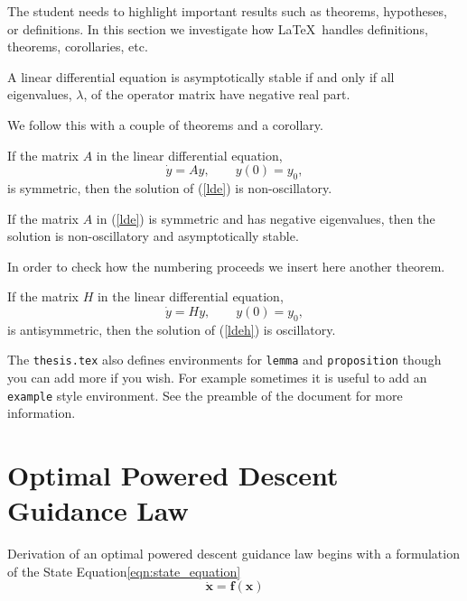 The student needs to highlight important results such as theorems,
hypotheses, or definitions. In this section we investigate how
\LaTeX\ handles definitions, theorems, corollaries, etc.
\begin{definition}   
  A linear differential equation is asymptotically stable if and only
  if all eigenvalues, $\lambda$, of the operator matrix have negative
  real part.
\end{definition}
We follow this with a couple of theorems and a corollary.
\begin{theorem}
  If the matrix $A$ in the linear differential equation,
  \begin{equation}
    \dot{y} = Ay, \qquad y(0) = y_0, \label{lde}
  \end{equation}
  is symmetric, then the solution of {\rm (\ref{lde})} is
  non-oscillatory.
\end{theorem}
\begin{corollary}
  If the matrix $A$ in {\rm (\ref{lde})} is symmetric and has negative
  eigenvalues, then the solution is non-oscillatory and asymptotically
  stable.
\end{corollary}

In order to check how the numbering proceeds we insert here another
theorem.
\begin{theorem}
  If the matrix $H$ in the linear differential equation,
  \begin{equation}
    \dot{y} = Hy, \qquad y(0) = y_0, \label{ldeh}
  \end{equation}
  is antisymmetric, then the solution of {\rm (\ref{ldeh})} is oscillatory.
\end{theorem}

The \texttt{thesis.tex} also defines environments for \texttt{lemma}
and \texttt{proposition} though you can add more if you wish.  For
example sometimes it is useful to add an \texttt{example} style
environment.  See the preamble of the document for more information.
















\section{Optimal Powered Descent Guidance Law}
Derivation of an optimal powered descent guidance law begins with a formulation of the State Equation\phantom{x}\ref{eqn:state_equation}
\begin{equation}
\dot{\boldsymbol{x}} = \boldsymbol{f}(\boldsymbol{x})
\label{eqn:state_equation}
\end{equation}

